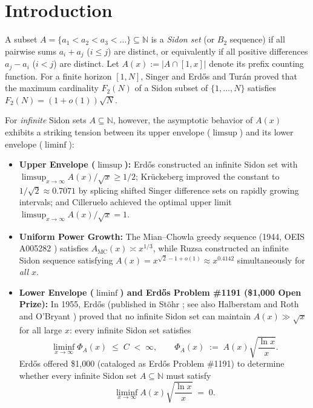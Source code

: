 \documentclass[11pt,reqno]{amsart}
\theoremstyle{definition}
\theoremstyle{remark}
\begin{document}
\maketitle

\section{Introduction}

A subset $A = \{a_1 < a_2 < a_3 < \dots\} \subseteq \mathbb{N}$ is a \emph{Sidon set} (or $B_2$ sequence) if all pairwise sums $a_i + a_j$ ($i \le j$) are distinct, or equivalently if all positive differences $a_j - a_i$ ($i < j$) are distinct. Let $A(x) := |A \cap [1, x]|$ denote its prefix counting function. For a finite horizon $[1, N]$, Singer \cite{Singer1938} and Erd\H{o}s and Tur\'an \cite{ErdosTuran1941} proved that the maximum cardinality $F_2(N)$ of a Sidon subset of $\{1, \dots, N\}$ satisfies $F_2(N) = (1 + o(1))\sqrt{N}$.

For \emph{infinite} Sidon sets $A \subseteq \mathbb{N}$, however, the asymptotic behavior of $A(x)$ exhibits a striking tension between its upper envelope ($\limsup$) and its lower envelope ($\liminf$):
\begin{itemize}
  \item \textbf{Upper Envelope ($\limsup$):} Erd\H{o}s \cite{Stohr1955} constructed an infinite Sidon set with $\limsup_{x\to\infty} A(x)/\sqrt{x} \ge 1/2$; Kr\"uckeberg \cite{Kruckeberg1961} improved the constant to $1/\sqrt{2} \approx 0.7071$ by splicing shifted Singer difference sets on rapidly growing intervals; and Cilleruelo \cite{Cilleruelo2014} achieved the optimal upper limit $\limsup_{x\to\infty} A(x)/\sqrt{x} = 1$.
  \item \textbf{Uniform Power Growth:} The Mian--Chowla greedy sequence (1944, OEIS A005282 \cite{MianChowla1944}) satisfies $A_{\mathrm{MC}}(x) \asymp x^{1/3}$, while Ruzsa \cite{Ruzsa1998} constructed an infinite Sidon sequence satisfying $A(x) = x^{\sqrt{2}-1+o(1)} \approx x^{0.4142}$ simultaneously for \emph{all} $x$.
  \item \textbf{Lower Envelope ($\liminf$) and Erd\H{o}s Problem \#1191 (\$1,000 Open Prize):} In 1955, Erd\H{o}s (published in St\"ohr \cite{Stohr1955}; see also Halberstam and Roth \cite{HalberstamRoth1966} and O'Bryant \cite{OBryant2004}) proved that no infinite Sidon set can maintain $A(x) \gg \sqrt{x}$ for all large $x$: every infinite Sidon set satisfies
  \begin{equation}\label{eq:erdos_1955}
    \liminf_{x \to \infty} \Phi_A(x) \;\le\; C \;<\; \infty, \qquad \Phi_A(x) \;:=\; A(x)\sqrt{\frac{\ln x}{x}}.
  \end{equation}
  Erd\H{o}s offered \$1,000 (cataloged as Erd\H{o}s Problem \#1191) to determine whether every infinite Sidon set $A \subseteq \mathbb{N}$ must satisfy
  \begin{equation}\label{eq:erdos1191_conjecture}
    \liminf_{x \to \infty} A(x)\sqrt{\frac{\ln x}{x}} \;=\; 0.
  \end{equation}
\end{itemize}
\end{document}
